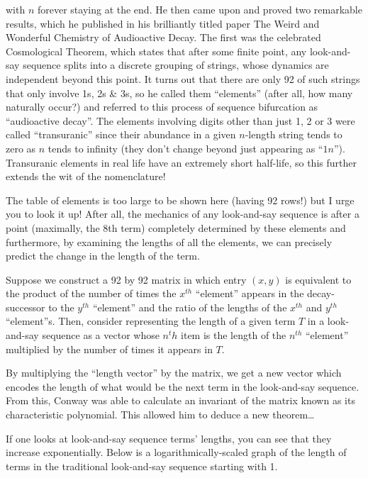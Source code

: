 with \(n\) forever staying at the end. He then came upon and proved two remarkable results, which he published in his brilliantly titled paper The Weird and Wonderful Chemistry of Audioactive Decay. The first was the celebrated Cosmological Theorem, which states that after some finite point, any look-and-say sequence splits into a discrete grouping of strings, whose dynamics are independent beyond this point. It turns out that there are only 92 of such strings that only involve 1s, 2s \& 3s, so he called them “elements” (after all, how many naturally occur?) and referred to this process of sequence bifurcation as “audioactive decay”. The elements involving digits other than just 1, 2 or 3 were called “transuranic” since their abundance in a given \(n\)-length string tends to zero as \(n\) tends to infinity (they don’t change beyond just appearing as “\(1n\)”). Transuranic elements in real life have an extremely short half-life, so this further extends the wit of the nomenclature!\par
The table of elements is too large to be shown here (having 92 rows!) but I urge you to look it up! After all, the mechanics of any look-and-say sequence is after a point (maximally, the 8th term) completely determined by these elements and furthermore, by examining the lengths of all the elements, we can precisely predict the change in the length of the term.\par
Suppose we construct a 92 by 92 matrix in which entry \((x, y)\) is equivalent to the product of the number of times the \(x^{th}\) “element” appears in the decay-successor to the \(y^{th}\) “element” and the ratio of the lengths of the \(x^{th}\) and \(y^{th}\) “element”s. Then, consider representing the length of a given term \(T\) in a look-and-say sequence as a vector whose \(n^th\) item is the length of the \(n^{th}\) “element” multiplied by the number of times it appears in \(T\).\par
By multiplying the “length vector” by the matrix, we get a new vector which encodes the length of what would be the next term in the look-and-say sequence. From this, Conway was able to calculate an invariant of the matrix known as its characteristic polynomial. This allowed him to deduce a new theorem…\par
If one looks at look-and-say sequence terms’ lengths, you can see that they increase exponentially. Below is a logarithmically-scaled graph of the length of terms in the traditional look-and-say sequence starting with 1.\par

